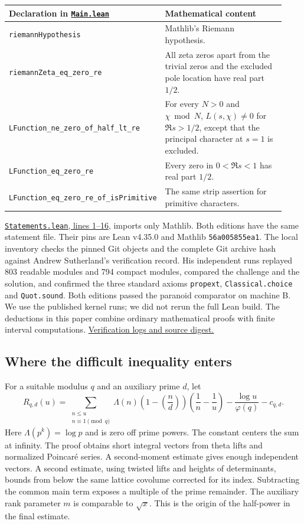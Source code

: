 \documentclass[11pt]{article}
\newcommand{\repo}{https://github.com/lsernau/grh-lean/blob/72fead102f663d5c7a407964a13dc0cf9d977207}
\newcommand{\src}[2]{\href{\repo/grh/src/#1.lean}{#2}}
\begin{document}
\begin{center}\small
\begin{tabular}{@{}p{0.44\linewidth}p{0.49\linewidth}@{}}\toprule
Declaration in \src{Main}{\texttt{Main.lean}} & Mathematical content \\ \midrule
\texttt{riemannHypothesis} & Mathlib's Riemann hypothesis.\\
\texttt{riemannZeta\_eq\_zero\_re} & All zeta zeros apart from the trivial zeros and the excluded pole location have real part $1/2$.\\
\texttt{LFunction\_ne\_zero\_of\_half\_lt\_re} & For every $N>0$ and $\chi\bmod N$, $L(s,\chi)\ne0$ for $\Re s>1/2$, except that the principal character at $s=1$ is excluded.\\
\texttt{LFunction\_eq\_zero\_re} & Every zero in $0<\Re s<1$ has real part $1/2$.\\
\texttt{LFunction\_eq\_zero\_re\_of\_isPrimitive} & The same strip assertion for primitive characters.\\ \bottomrule
\end{tabular}\end{center}

\src{Statements}{\texttt{Statements.lean}, lines 1--16}, imports only Mathlib. Both editions have the same statement file. Their pins are Lean v4.35.0 and Mathlib \texttt{56a005855ea1}. The local inventory checks the pinned Git objects and the complete Git archive hash against Andrew Sutherland's verification record. His independent runs replayed 803 readable modules and 794 compact modules, compared the challenge and the solution, and confirmed the three standard axioms \texttt{propext}, \texttt{Classical.choice} and \texttt{Quot.sound}. Both editions passed the paranoid comparator on machine B. We use the published kernel runs; we did not rerun the full Lean build. The deductions in this paper combine ordinary mathematical proofs with finite interval computations. \href{https://math.mit.edu/~drew/shortgrh/}{Verification logs and source digest.}

\subsection{Where the difficult inequality enters}
For a suitable modulus $q$ and an auxiliary prime $d$, let
\[
 R_{q,d}(u)=\sum_{\substack{n\le u\\n\equiv1\pmod q}}
 \Lambda(n)\left(1-\left(\frac nd\right)\right)
 \left(\frac1n-\frac1u\right)-\frac{\log u}{\varphi(q)}-c_{q,d}.
\]
Here $\Lambda(p^k)=\log p$ and is zero off prime powers. The constant centers the sum at infinity. The proof obtains short integral vectors from theta lifts and normalized Poincaré series. A second-moment estimate gives enough independent vectors. A second estimate, using twisted lifts and heights of determinants, bounds from below the same lattice covolume corrected for its index. Subtracting the common main term exposes a multiple of the prime remainder. The auxiliary rank parameter $m$ is comparable to $\sqrt{x}$. This is the origin of the half-power in the final estimate.
\end{document}
